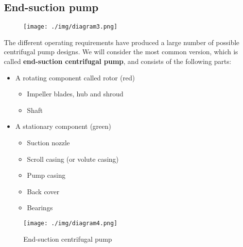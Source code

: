 \subsection{End-suction pump}
\begin{figure}[H]
  \centering
  \texttt{[image: ./img/diagram3.png]}
\end{figure}
The different operating requirements have produced a large number of possible centrifugal pump designs. We will consider the most common version, which is called \textbf{end-suction centrifugal pump}, and consists of the following parts:
\begin{itemize}
  \item A rotating component called rotor (red)
        \begin{itemize}
          \item Impeller blades, hub and shroud
          \item Shaft
        \end{itemize}
  \item A stationary component (green)
        \begin{itemize}
          \item Suction nozzle
          \item Scroll casing (or volute casing)
          \item Pump casing
          \item Back cover
          \item Bearings
        \end{itemize}
\end{itemize}
\begin{figure}[H]
  \centering
  \texttt{[image: ./img/diagram4.png]}
  \caption{End-suction centrifugal pump}
\end{figure}
